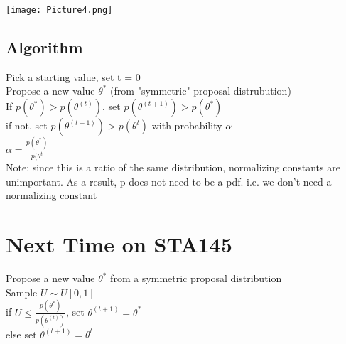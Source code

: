 \documentclass{article}
\begin{document}
\texttt{[image: Picture4.png]}

\subsection{Algorithm}
\textbullet\: Pick a starting value, set t = 0 \\
\textbullet\: Propose a new value $\theta^{*}$ (from "symmetric" proposal 
distrubution) \\
\textbullet\: If $p(\theta^{*}) > p(\theta^{(t)})$, set $p(\theta^{(t+1)}) > 
p(\theta^{*})$ \\
\indent if not, set $p(\theta^{(t+1)}) > p(\theta^{t})$ with probability 
$\alpha$ \\ 
\indent $\alpha = \frac{p(\theta^{*})}{p(\theta^{t}}$ \\
Note: since this is a ratio of the same distribution, normalizing constants 
are unimportant. As a result, p does not need to be a pdf. i.e. we don't need 
a normalizing constant
\section{Next Time on STA145}
\textbullet\: Propose a new value $\theta^{*}$ from a symmetric proposal 
distribution \\
\textbullet\: Sample $U \sim U[0, 1]$\\
if $U \le \frac{p(\theta^{*})}{p(\theta^{(t)})}$, set $\theta^{(t+1)} = 
  \theta^{*}$ \\
  else set $\theta^{(t+1)} = \theta^{t}$
\end{document}

